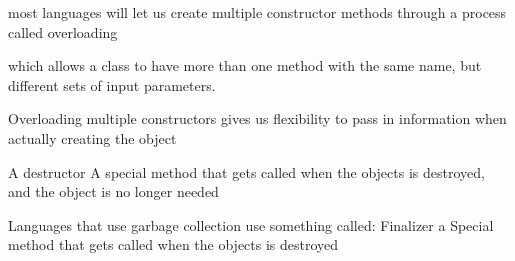most languages will let us create multiple constructor methods through a process called overloading

which allows a class to have more than one method with the same name, but different sets of input parameters.

Overloading multiple constructors gives us flexibility to pass in information when actually creating the object

A destructor 
  A special method that gets called when the objects is destroyed, and the object is no longer needed 


Languages that use garbage collection use something called:
Finalizer
  a Special method that gets called when the objects is destroyed  